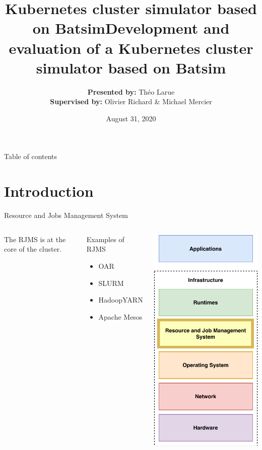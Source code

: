 \documentclass[12pt, aspectratio=43]{beamer}
\title{Kubernetes cluster simulator based on Batsim}
\title{Development and evaluation of a Kubernetes cluster simulator based on
Batsim}
\author{\textbf{Presented by:} Théo Larue\\\textbf{Supervised by:} Olivier
Richard \& Michael Mercier}
\date{August 31, 2020}
\institute[Théo LARUE]{Université Grenoble Alpes}
\begin{document}
\frame{\titlepage}

\begin{frame}{Table of contents}
	\tableofcontents
\end{frame}

\section{Introduction}

\begin{frame}{Resource and Jobs Management System}
	\begin{columns}
		The RJMS is at the core of the cluster.
		\begin{exampleblock}{Examples of RJMS}
			\begin{itemize}
				\item OAR
				\item SLURM
				\item HadoopYARN
				\item Apache Mesos
			\end{itemize}
		\end{exampleblock}

		\centering
		\includegraphics[scale=0.6]{../imgs/RJMS.pdf}
	\end{columns}
\end{frame}
\end{document}
